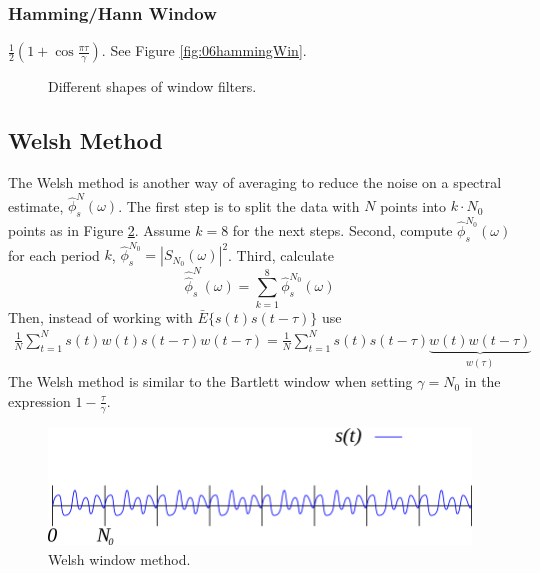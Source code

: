 \documentclass[lecture,12pt,]{pcms-l}
\theoremstyle{example}
\newcommand{\w}{\omega}
\begin{document}
\subsubsection{Hamming/Hann Window}
$\frac{1}{2}\left(1+\cos\frac{\pi\tau}{\gamma}\right)$. See Figure \ref{fig:06hammingWin}.

\begin{figure}[ht!]
	\centering
	 \hfill
	 \hfill
	\caption{Different shapes of window filters.}
	\label{fig:06filterShapes}
\end{figure}

\subsection{Welsh Method}
The Welsh method is another way of averaging to reduce the noise on a spectral estimate, $\hat{\phi}_s^N(\w)$. The first step is to split the data with $N$ points into $k\cdot N_0$ points as in Figure \ref{fig:06welsh}. Assume $k=8$ for the next steps. Second, compute $\hat{\phi}_s^{N_0}(\w)$ for each period $k$, $\hat{\phi}_s^{N_0} = |S_{N_0}(\w)|^2$. Third, calculate
$$\hat{\hat{\phi}}_s^N(\w) = \sum_{k=1}^8 \hat{\phi}_s^{N_0}(\w)$$
Then, instead of working with $\bar{E}\{s(t)s(t-\tau)\}$ use
\begin{align*}
\frac{1}{N}\sum_{t=1}^Ns(t)w(t)s(t-\tau)w(t-\tau) =
\frac{1}{N}\sum_{t=1}^Ns(t)s(t-\tau) \underbrace{w(t)w(t-\tau)}_{w(\tau)}
\end{align*}
The Welsh method is similar to the Bartlett window when setting $\gamma=N_0$ in the expression $1-\frac{\tau}{\gamma}$.

\begin{figure}[ht!]
	\centering
	\includegraphics[width=.4\textwidth]{images/06welsh}
	\caption{Welsh window method.}
	\label{fig:06welsh}
\end{figure}
\end{document}
